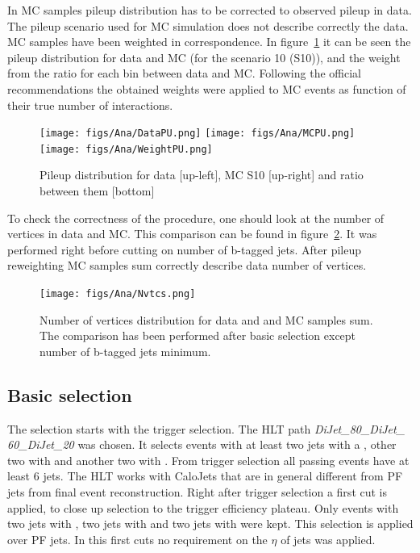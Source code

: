 In MC samples pileup distribution has to be corrected to observed pileup in data. The pileup scenario used for MC simulation does not describe correctly the data. MC samples have been weighted in correspondence. In figure~\ref{fig:PU_distros} it can be seen the pileup distribution for data and MC (for the scenario 10 (S10)), and the weight from the ratio for each bin between data and MC. Following the official recommendations the obtained weights were applied to MC events as function of their true number of interactions.

\begin{figure}[!Hhtbp]
  \begin{center}
    \texttt{[image: figs/Ana/DataPU.png]}
    \texttt{[image: figs/Ana/MCPU.png]}
    \texttt{[image: figs/Ana/WeightPU.png]}
    \caption{Pileup distribution for data [up-left], MC S10 [up-right] and ratio between them [bottom]}
    \label{fig:PU_distros}
  \end{center}
\end{figure}

To check the correctness of the procedure, one should look at the number of vertices in data and MC. This comparison can be found in figure~\ref{fig:NV_dataMC}. It was performed right before cutting on number of b-tagged jets. After pileup reweighting MC samples sum correctly describe data number of vertices.

\begin{figure}[!Hhtbp]
  \begin{center}
    \texttt{[image: figs/Ana/Nvtcs.png]}
    \caption{Number of vertices distribution for data and and MC samples sum. The comparison has been performed after basic selection except number of b-tagged jets minimum.}
    \label{fig:NV_dataMC}
  \end{center}
\end{figure}

\subsection{Basic selection}

The selection starts with the trigger selection. The HLT path \textit{DiJet\_80\_DiJet\_\\60\_DiJet\_20} was chosen. It selects events with at least two jets with a , other two with  and another two with . From trigger selection all passing events have at least 6 jets. The HLT works with CaloJets that are in general different from PF jets from final event reconstruction. Right after trigger selection a first cut is applied, to close up selection to the trigger efficiency plateau. Only events with two jets with , two jets with  and two jets with  were kept. This selection is applied over PF jets. In this first cuts no requirement on the $\eta$ of jets was applied.

